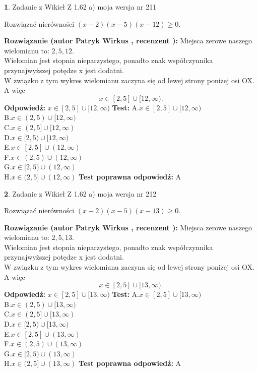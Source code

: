 \documentclass[12pt, a4paper]{article}
\theoremstyle{definition} %
\newtheorem{zad}{}
\newcommand{\zadStart}[1]{\begin{zad}#1\newline}
\newcommand{\zadStop}{\end{zad}}
\newcommand{\rozwStart}[2]{\noindent \textbf{Rozwiązanie (autor #1 , recenzent #2): }\newline}
\newcommand{\rozwStop}{\newline}
\newcommand{\odpStart}{\noindent \textbf{Odpowiedź:}\newline}
\newcommand{\odpStop}{\newline}
\newcommand{\testStart}{\noindent \textbf{Test:}\newline}
\newcommand{\testStop}{\newline}
\newcommand{\kluczStart}{\noindent \textbf{Test poprawna odpowiedź:}\newline}
\newcommand{\kluczStop}{\newline}
\begin{document}
\zadStart{Zadanie z Wikieł Z 1.62 a) moja wersja nr 211}

Rozwiązać nierówności $(x-2)(x-5)(x-12)\ge0$.
\zadStop
\rozwStart{Patryk Wirkus}{}
Miejsca zerowe naszego wielomianu to: $2, 5, 12$.\\
Wielomian jest stopnia nieparzystego, ponadto znak współczynnika przy\linebreak najwyższej potędze x jest dodatni.\\ W związku z tym wykres wielomianu zaczyna się od lewej strony poniżej osi OX. A więc $$x \in [2,5] \cup [12,\infty).$$
\rozwStop
\odpStart
$x \in [2,5] \cup [12,\infty)$
\odpStop
\testStart
A.$x \in [2,5] \cup [12,\infty)$\\
B.$x \in (2,5) \cup [12,\infty)$\\
C.$x \in (2,5] \cup [12,\infty)$\\
D.$x \in [2,5) \cup [12,\infty)$\\
E.$x \in [2,5] \cup (12,\infty)$\\
F.$x \in (2,5) \cup (12,\infty)$\\
G.$x \in [2,5) \cup (12,\infty)$\\
H.$x \in (2,5] \cup (12,\infty)$
\testStop
\kluczStart
A
\kluczStop



\zadStart{Zadanie z Wikieł Z 1.62 a) moja wersja nr 212}

Rozwiązać nierówności $(x-2)(x-5)(x-13)\ge0$.
\zadStop
\rozwStart{Patryk Wirkus}{}
Miejsca zerowe naszego wielomianu to: $2, 5, 13$.\\
Wielomian jest stopnia nieparzystego, ponadto znak współczynnika przy\linebreak najwyższej potędze x jest dodatni.\\ W związku z tym wykres wielomianu zaczyna się od lewej strony poniżej osi OX. A więc $$x \in [2,5] \cup [13,\infty).$$
\rozwStop
\odpStart
$x \in [2,5] \cup [13,\infty)$
\odpStop
\testStart
A.$x \in [2,5] \cup [13,\infty)$\\
B.$x \in (2,5) \cup [13,\infty)$\\
C.$x \in (2,5] \cup [13,\infty)$\\
D.$x \in [2,5) \cup [13,\infty)$\\
E.$x \in [2,5] \cup (13,\infty)$\\
F.$x \in (2,5) \cup (13,\infty)$\\
G.$x \in [2,5) \cup (13,\infty)$\\
H.$x \in (2,5] \cup (13,\infty)$
\testStop
\kluczStart
A
\kluczStop
\end{document}
